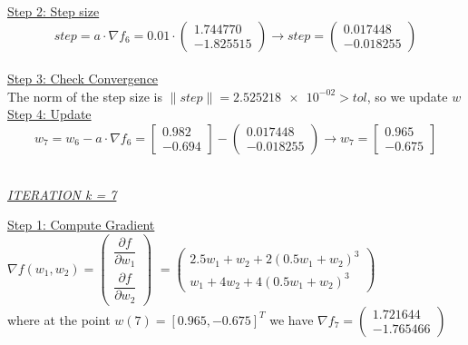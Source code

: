 \underline{Step 2: Step size}
\[
step = a \cdot \nabla f_{6} = 0.01 \cdot \left(\begin{array}{c}
	1.744770 \\
   -1.825515
\end{array}\right) \rightarrow step =\left(\begin{array}{c}
0.017448 \\
-0.018255
\end{array}\right)
\]
\\[4mm]

\underline{Step 3: Check Convergence}\\
The norm of the step size is $\| step \| = \num{2.525218e-02} > tol$, so we update $w$
\\[4mm]

\underline{Step 4: Update}
\[ 
w_7 = w_6 - a\cdot \nabla f_6 =  \left[\begin{array}{c}
	0.982\\
	-0.694
\end{array}\right] - \left(\begin{array}{c}
0.017448 \\
-0.018255
\end{array}\right) \rightarrow
w_7 = \left[\begin{array}{c}
	0.965\\
	-0.675
\end{array}\right]
\]
\\[4mm]

\begin{center}
	\underline{\textit{ITERATION k = 7}}
\end{center}

\underline{Step 1: Compute Gradient}\\
\(\nabla f(w_1,w_2) = \left(\begin{array}{c}
	\dfrac{\partial f}{\partial w_1} \\[4mm]
	\dfrac{\partial f}{\partial w_2}
\end{array}\right)\) $= \left(\begin{array}{c}
	2.5w_1 + w_2 + 2(0.5w_1+w_2)^3\\[1mm]
	w_1 + 4w_2 + 4(0.5w_1+w_2)^3
\end{array}\right)$ \\[3mm]

where at the point $w\left(7\right) = \left[0.965, -0.675\right]^T$ we have $\nabla f_{7} = \left(\begin{array}{c}
	1.721644 \\
-1.765466
\end{array}\right)$
\\[4mm]

